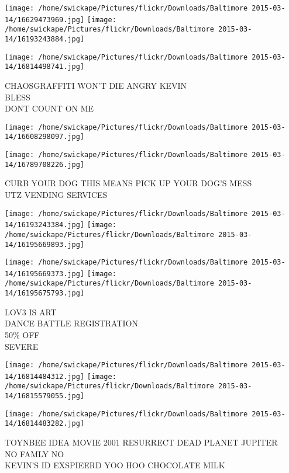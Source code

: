 \documentclass[10pt,letterpaper]{article}
\begin{document}
\texttt{[image: /home/swickape/Pictures/flickr/Downloads/Baltimore 2015-03-14/16629473969.jpg]}
\texttt{[image: /home/swickape/Pictures/flickr/Downloads/Baltimore 2015-03-14/16193243884.jpg]}

\vspace{0.25in}
\texttt{[image: /home/swickape/Pictures/flickr/Downloads/Baltimore 2015-03-14/16814498741.jpg]}

CHAOSGRAFFITI WON'T DIE ANGRY KEVIN\\
BLESS\\
DONT COUNT ON ME\\
\pagebreak

\texttt{[image: /home/swickape/Pictures/flickr/Downloads/Baltimore 2015-03-14/16608298097.jpg]}

\vspace{0.25in}
\texttt{[image: /home/swickape/Pictures/flickr/Downloads/Baltimore 2015-03-14/16789708226.jpg]}

CURB YOUR DOG THIS MEANS PICK UP YOUR DOG'S MESS\\
UTZ VENDING SERVICES\\
\pagebreak

\texttt{[image: /home/swickape/Pictures/flickr/Downloads/Baltimore 2015-03-14/16193243384.jpg]}
\texttt{[image: /home/swickape/Pictures/flickr/Downloads/Baltimore 2015-03-14/16195669893.jpg]}

\texttt{[image: /home/swickape/Pictures/flickr/Downloads/Baltimore 2015-03-14/16195669373.jpg]}
\texttt{[image: /home/swickape/Pictures/flickr/Downloads/Baltimore 2015-03-14/16195675793.jpg]}

LOV3 IS ART\\
DANCE BATTLE REGISTRATION\\
50\% OFF\\
SEVERE\\
\pagebreak

\texttt{[image: /home/swickape/Pictures/flickr/Downloads/Baltimore 2015-03-14/16814484312.jpg]}
\texttt{[image: /home/swickape/Pictures/flickr/Downloads/Baltimore 2015-03-14/16815579055.jpg]}

\texttt{[image: /home/swickape/Pictures/flickr/Downloads/Baltimore 2015-03-14/16814483282.jpg]}

TOYNBEE IDEA MOVIE 2001 RESURRECT DEAD PLANET JUPITER\\
NO FAMLY NO\\
KEVIN'S ID EXSPIEERD YOO HOO CHOCOLATE MILK\\
\pagebreak
\end{document}
